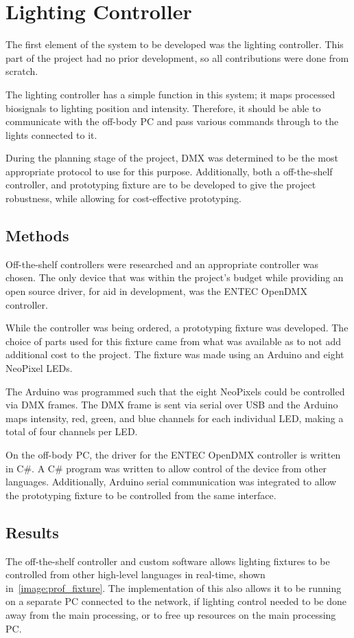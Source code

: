 \chapter{Lighting Controller}
The first element of the system to be developed was the lighting controller.
This part of the project had no prior development, so all contributions were done from scratch.

The lighting controller has a simple function in this system; it maps processed biosignals to lighting position and intensity.
Therefore, it should be able to communicate with the off-body PC and pass various commands through to the lights connected to it.

During the planning stage of the project, DMX was determined to be the most appropriate protocol to use for this purpose.
Additionally, both a off-the-shelf controller, and prototyping fixture are to be developed to give the project robustness,
while allowing for cost-effective prototyping.


\section{Methods}
Off-the-shelf controllers were researched and an appropriate controller was chosen.
The only device that was within the project's budget while providing an open source driver, for aid in development,
was the ENTEC OpenDMX controller.

While the controller was being ordered, a prototyping fixture was developed.
The choice of parts used for this fixture came from what was available as to not add additional cost to the project.
The fixture was made using an Arduino and eight NeoPixel LEDs.

The Arduino was programmed such that the eight NeoPixels could be controlled via DMX frames.
The DMX frame is sent via serial over USB
and the Arduino maps intensity, red, green, and blue channels for each individual LED, making a total of four channels per LED.

On the off-body PC, the driver for the ENTEC OpenDMX controller is written in C\#.
A C\# program was written to allow control of the device from other languages.
Additionally, Arduino serial communication was integrated to allow the prototyping fixture to be controlled from the same interface.


\section{Results}
The off-the-shelf controller and custom software allows lighting fixtures to be controlled from other high-level languages in real-time,
shown in~\autoref{image:prof_fixture}.
The implementation of this also allows it to be running on a separate PC connected to the network,
if lighting control needed to be done away from the main processing, or to free up resources on the main processing PC.

